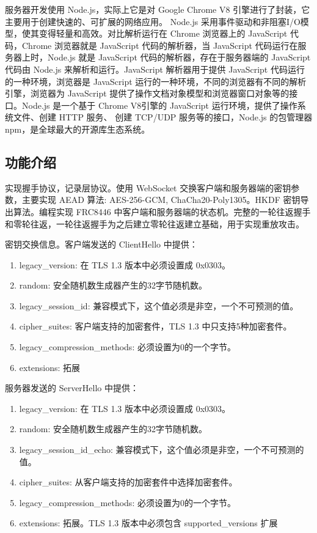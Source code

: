     服务器开发使用 Node.js，实际上它是对 Google Chrome V8 引擎进行了封装，它主要用于创建快速的、可扩展的网络应用。 Node.js 采用事件驱动和非阻塞I/O模型，使其变得轻量和高效。对比解析运行在 Chrome 浏览器上的 JavaScript 代码，Chrome 浏览器就是 JavaScript 代码的解析器，当 JavaScript 代码运行在服务器上时，Node.js 就是 JavaScript 代码的解析器，存在于服务器端的 JavaScript 代码由 Node.js 来解析和运行。JavaScript 解析器用于提供 JavaScript 代码运行的一种环境，浏览器是 JavaScript 运行的一种环境，不同的浏览器有不同的解析引擎，浏览器为 JavaScript 提供了操作文档对象模型和浏览器窗口对象等的接口。Node.js 是一个基于 Chrome V8引擎的 JavaScript 运行环境，提供了操作系统文件、创建 HTTP 服务、 创建 TCP/UDP 服务等的接口，Node.js 的包管理器 npm，是全球最大的开源库生态系统。

  \subsection{功能介绍}

  实现握手协议，记录层协议。使用 WebSocket 交换客户端和服务器端的密钥参数，主要实现 AEAD 算法: AES-256-GCM, ChaCha20-Poly1305。HKDF\cite{RFC5869} 密钥导出算法。编程实现 FRC8446 中客户端和服务器端的状态机。完整的一轮往返握手和零轮往返，一轮往返握手为之后建立零轮往返建立基础，用于实现重放攻击。

  密钥交换信息。客户端发送的 ClientHello 中提供：

  \begin{enumerate}
    \item legacy\_version: 在 TLS 1.3 版本中必须设置成 0x0303。
    \item random: 安全随机数生成器产生的32字节随机数。
    \item legacy\_session\_id: 兼容模式下，这个值必须是非空，一个不可预测的值。
    \item cipher\_suites: 客户端支持的加密套件，TLS 1.3 中只支持5种加密套件。
    \item legacy\_compression\_methods: 必须设置为0的一个字节。
    \item extensions: 拓展
  \end{enumerate}

  服务器发送的 ServerHello 中提供：

  \begin{enumerate}
    \item legacy\_version: 在 TLS 1.3 版本中必须设置成 0x0303。
    \item random: 安全随机数生成器产生的32字节随机数。
    \item legacy\_session\_id\_echo: 兼容模式下，这个值必须是非空，一个不可预测的值。
    \item cipher\_suites: 从客户端支持的加密套件中选择加密套件。
    \item legacy\_compression\_methods: 必须设置为0的一个字节。
    \item extensions: 拓展。TLS 1.3 版本中必须包含 supported\_versions 扩展
  \end{enumerate}


